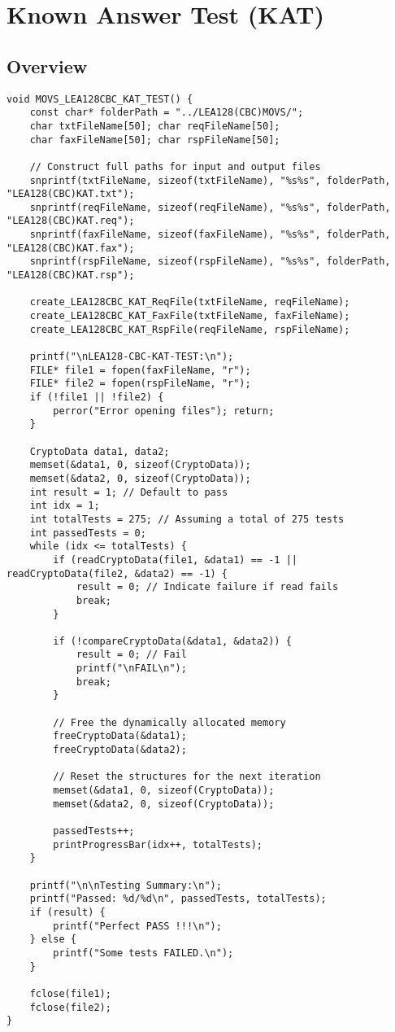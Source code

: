 \newpage
\section{Known Answer Test (KAT)}
\subsection{Overview}
\begin{lstlisting}[style=C]
void MOVS_LEA128CBC_KAT_TEST() {
	const char* folderPath = "../LEA128(CBC)MOVS/";
	char txtFileName[50]; char reqFileName[50];
	char faxFileName[50]; char rspFileName[50];
	
	// Construct full paths for input and output files
	snprintf(txtFileName, sizeof(txtFileName), "%s%s", folderPath, "LEA128(CBC)KAT.txt");
	snprintf(reqFileName, sizeof(reqFileName), "%s%s", folderPath, "LEA128(CBC)KAT.req");
	snprintf(faxFileName, sizeof(faxFileName), "%s%s", folderPath, "LEA128(CBC)KAT.fax");
	snprintf(rspFileName, sizeof(rspFileName), "%s%s", folderPath, "LEA128(CBC)KAT.rsp");
	
	create_LEA128CBC_KAT_ReqFile(txtFileName, reqFileName);
	create_LEA128CBC_KAT_FaxFile(txtFileName, faxFileName);
	create_LEA128CBC_KAT_RspFile(reqFileName, rspFileName);
	
	printf("\nLEA128-CBC-KAT-TEST:\n");	
	FILE* file1 = fopen(faxFileName, "r");
	FILE* file2 = fopen(rspFileName, "r");
	if (!file1 || !file2) {
		perror("Error opening files"); return;
	}
	
	CryptoData data1, data2;
	memset(&data1, 0, sizeof(CryptoData));
	memset(&data2, 0, sizeof(CryptoData));
	int result = 1; // Default to pass
	int idx = 1;
	int totalTests = 275; // Assuming a total of 275 tests
	int passedTests = 0;
	while (idx <= totalTests) {
		if (readCryptoData(file1, &data1) == -1 || readCryptoData(file2, &data2) == -1) {
			result = 0; // Indicate failure if read fails
			break;
		}
		
		if (!compareCryptoData(&data1, &data2)) {
			result = 0; // Fail
			printf("\nFAIL\n");
			break;
		}
		
		// Free the dynamically allocated memory
		freeCryptoData(&data1);
		freeCryptoData(&data2);
		
		// Reset the structures for the next iteration
		memset(&data1, 0, sizeof(CryptoData));
		memset(&data2, 0, sizeof(CryptoData));
		
		passedTests++;
		printProgressBar(idx++, totalTests);
	}

	printf("\n\nTesting Summary:\n");
	printf("Passed: %d/%d\n", passedTests, totalTests);
	if (result) {
		printf("Perfect PASS !!!\n");
	} else {
		printf("Some tests FAILED.\n");
	}
	
	fclose(file1);
	fclose(file2);
}
\end{lstlisting}

